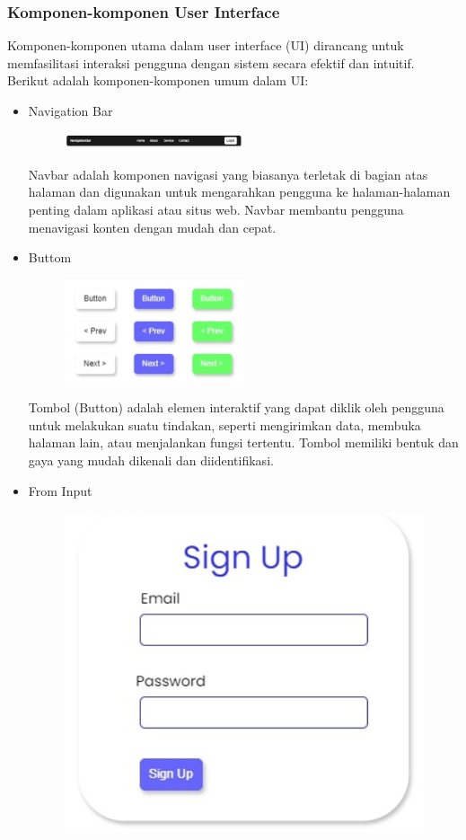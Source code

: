 \documentclass[12pt]{article}
\begin{document}
\subsubsection{Komponen-komponen User Interface}

Komponen-komponen utama dalam user interface (UI) dirancang untuk memfasilitasi interaksi pengguna dengan sistem secara efektif dan intuitif. Berikut adalah komponen-komponen umum dalam UI:
\begin{itemize}
    \item Navigation Bar
\begin{figure}[h] %
    \centering
    \includegraphics[width=0.5\textwidth]{asset/navbar.png }
\end{figure}

    Navbar adalah komponen navigasi yang biasanya terletak di bagian atas halaman dan digunakan untuk mengarahkan pengguna ke halaman-halaman penting dalam aplikasi atau situs web. Navbar membantu pengguna menavigasi konten dengan mudah dan cepat.

    \item Buttom
\begin{figure}[h] %
    \centering
    \includegraphics[width=0.5\textwidth]{asset/button.png }
\end{figure}

    Tombol (Button) adalah elemen interaktif yang dapat diklik oleh pengguna untuk melakukan suatu tindakan, seperti mengirimkan data, membuka halaman lain, atau menjalankan fungsi tertentu. Tombol memiliki bentuk dan gaya yang mudah dikenali dan diidentifikasi.

    \item From Input 

\begin{figure}
    \centering
    \includegraphics[width=0.5\linewidth]{asset/formInput.png}
\end{figure}


\end{itemize}
\end{document}
